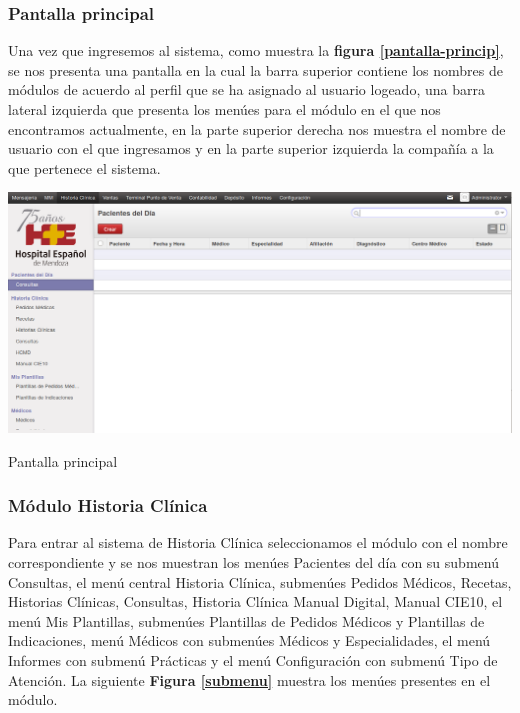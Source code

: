{\correccionTexto
\subsubsection{Pantalla principal}
Una vez que ingresemos al sistema, como muestra la \textbf{figura \ref{pantalla-princip}}, se nos presenta una pantalla en la cual la barra superior contiene los nombres de módulos de acuerdo al perfil que se ha asignado al usuario logeado, una barra lateral izquierda que presenta los menúes para el módulo en el que nos encontramos actualmente, en la parte superior derecha nos muestra el nombre de usuario con el que ingresamos y en la parte superior izquierda la compañía a la que pertenece el sistema.
}

\begin{correccionFigure}[h]
      \centering
      \includegraphics[width=.8\textwidth]{img/tp1/HE/PantallaPrincip}
      \caption{Pantalla principal}
      \label{pantalla-princip}
\end{correccionFigure}

{\correccionTexto
\subsubsection{Módulo Historia Clínica}
Para entrar al sistema de Historia Clínica seleccionamos el módulo con el nombre correspondiente y se nos muestran los menúes Pacientes del día con su submenú Consultas, el menú central Historia Clínica, submenúes Pedidos Médicos, Recetas, Historias Clínicas, Consultas, Historia Clínica Manual Digital, Manual CIE10, el menú Mis Plantillas, submenúes Plantillas de Pedidos Médicos y Plantillas de Indicaciones, menú Médicos con submenúes Médicos y Especialidades, el menú Informes con submenú Prácticas y el menú Configuración con submenú Tipo de Atención. La siguiente \textbf{Figura \ref{submenu}} muestra los menúes presentes en el módulo.
}

